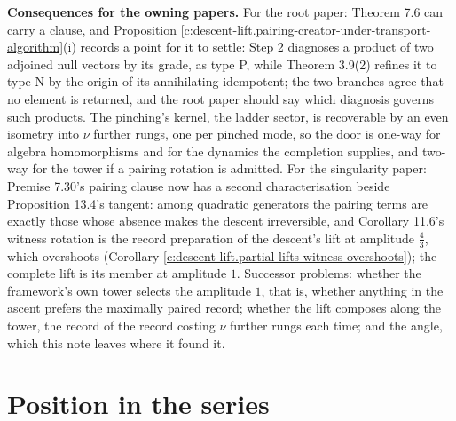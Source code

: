 \documentclass[11pt]{article}
\theoremstyle{definition}
\theoremstyle{plain}
\begin{document}
\label{c:note.descent-lift.setting-what-does-two-papers-what-7}
\textbf{Consequences for the owning papers.} For the root paper: Theorem 7.6 can carry a clause, and Proposition \ref{c:descent-lift.pairing-creator-under-transport-algorithm}(i) records a point for it to settle: Step 2 diagnoses a product of two adjoined null vectors by its grade, as type P, while Theorem 3.9(2) refines it to type N by the origin of its annihilating idempotent; the two branches agree that no element is returned, and the root paper should say which diagnosis governs such products. The pinching's kernel, the ladder sector, is recoverable by an even isometry into $\nu$ further rungs, one per pinched mode, so the door is one-way for algebra homomorphisms and for the dynamics the completion supplies, and two-way for the tower if a pairing rotation is admitted. For the singularity paper: Premise 7.30's pairing clause now has a second characterisation beside Proposition 13.4's tangent: among quadratic generators the pairing terms are exactly those whose absence makes the descent irreversible, and Corollary 11.6's witness rotation is the record preparation of the descent's lift at amplitude $\tfrac43$, which overshoots (Corollary \ref{c:descent-lift.partial-lifts-witness-overshoots}); the complete lift is its member at amplitude $1$. Successor problems: whether the framework's own tower selects the amplitude $1$, that is, whether anything in the ascent prefers the maximally paired record; whether the lift composes along the tower, the record of the record costing $\nu$ further rungs each time; and the angle, which this note leaves where it found it.

\section{Position in the series}
\end{document}
